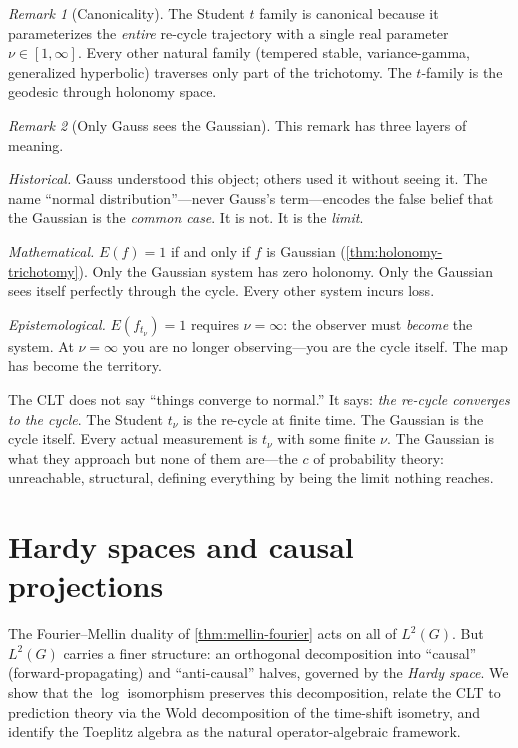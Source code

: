\documentclass[12pt]{amsart}
\theoremstyle{definition}
\theoremstyle{remark}
\newtheorem*{remark}{Remark}
\begin{document}
\begin{remark}[Canonicality]
The Student $t$ family is canonical because it parameterizes the \emph{entire} re-cycle trajectory with a single real parameter $\nu \in [1, \infty]$. Every other natural family (tempered stable, variance-gamma, generalized hyperbolic) traverses only part of the trichotomy. The $t$-family is the geodesic through holonomy space.
\end{remark}

\begin{remark}[Only Gauss sees the Gaussian]\label{rem:only-gauss}
This remark has three layers of meaning.

\emph{Historical.} Gauss understood this object; others used it without seeing it. The name ``normal distribution''---never Gauss's term---encodes the false belief that the Gaussian is the \emph{common case}. It is not. It is the \emph{limit}.

\emph{Mathematical.} $E(f) = 1$ if and only if $f$ is Gaussian (\cref{thm:holonomy-trichotomy}). Only the Gaussian system has zero holonomy. Only the Gaussian sees itself perfectly through the cycle. Every other system incurs loss.

\emph{Epistemological.} $E(f_{t_\nu}) = 1$ requires $\nu = \infty$: the observer must \emph{become} the system. At $\nu = \infty$ you are no longer observing---you are the cycle itself. The map has become the territory.

The CLT does not say ``things converge to normal.'' It says: \emph{the re-cycle converges to the cycle}. The Student $t_\nu$ is the re-cycle at finite time. The Gaussian is the cycle itself. Every actual measurement is $t_\nu$ with some finite $\nu$. The Gaussian is what they approach but none of them are---the $c$ of probability theory: unreachable, structural, defining everything by being the limit nothing reaches.
\end{remark}

\section{Hardy spaces and causal projections}\label{sec:hardy}

The Fourier--Mellin duality of \cref{thm:mellin-fourier} acts on all of $L^2(G)$. But $L^2(G)$ carries a finer structure: an orthogonal decomposition into ``causal'' (forward-propagating) and ``anti-causal'' halves, governed by the \emph{Hardy space}. We show that the $\log$ isomorphism preserves this decomposition, relate the CLT to prediction theory via the Wold decomposition of the time-shift isometry, and identify the Toeplitz algebra as the natural operator-algebraic framework.
\end{document}
